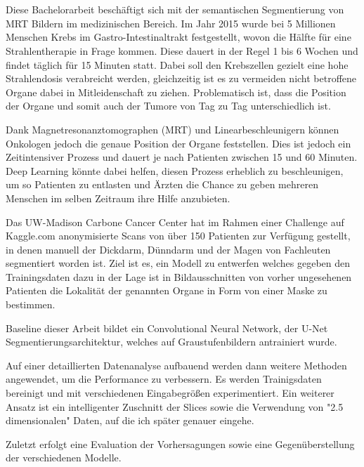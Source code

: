 \section*{}


Diese Bachelorarbeit beschäftigt sich mit der semantischen Segmentierung von MRT Bildern im medizinischen Bereich. Im Jahr 2015 wurde bei 5 Millionen Menschen Krebs im Gastro-Intestinaltrakt festgestellt, wovon die Hälfte für eine Strahlentherapie in Frage kommen. Diese dauert in der Regel 1 bis 6 Wochen und findet täglich für 15 Minuten statt. Dabei soll den Krebszellen gezielt eine hohe Strahlendosis verabreicht werden, gleichzeitig ist es zu vermeiden nicht betroffene Organe dabei in Mitleidenschaft zu ziehen. Problematisch ist, dass  die Position der Organe und somit auch der Tumore von Tag zu Tag unterschiedlich ist. 

Dank Magnetresonanztomographen (MRT) und Linearbeschleunigern können Onkologen jedoch die genaue Position der Organe feststellen. Dies ist jedoch ein Zeitintensiver Prozess und dauert je nach Patienten zwischen 15 und 60 Minuten. Deep Learning könnte dabei helfen, diesen Prozess erheblich zu beschleunigen, um so Patienten zu entlasten und Ärzten die Chance zu geben mehreren Menschen im selben Zeitraum ihre Hilfe anzubieten. 

Das UW-Madison Carbone Cancer Center hat im Rahmen einer Challenge auf Kaggle.com anonymisierte Scans von über 150 Patienten zur Verfügung gestellt, in denen manuell der Dickdarm, Dünndarm und der Magen von Fachleuten segmentiert worden ist. Ziel ist es, ein Modell zu entwerfen welches gegeben den Trainingsdaten dazu in der Lage ist in Bildausschnitten von vorher ungesehenen Patienten die Lokalität der genannten Organe in Form von einer Maske zu bestimmen. 

Baseline dieser Arbeit bildet ein Convolutional Neural Network, der U-Net Segmentierungsarchitektur, welches auf Graustufenbildern antrainiert wurde. 

Auf einer detaillierten Datenanalyse aufbauend werden dann weitere Methoden angewendet, um die Performance zu verbessern. Es werden Trainigsdaten bereinigt und mit verschiedenen Eingabegrößen experimentiert. Ein weiterer Ansatz ist ein intelligenter Zuschnitt der Slices sowie die Verwendung von "2.5 dimensionalen" Daten, auf die ich später genauer eingehe. 

Zuletzt erfolgt eine Evaluation der Vorhersagungen sowie eine Gegenüberstellung der verschiedenen Modelle.